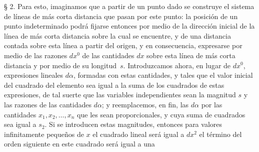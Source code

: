 \documentclass[a4paper, 12pt]{article}
\begin{document}
§ 2. Para esto, imaginamos que a partir de un punto dado se construye el sistema de líneas de más corta distancia que pasan por este punto: la posición de un punto indeterminado podrá fijarse entonces por medio de la dirección inicial de la línea de más corta distancia sobre la cual se encuentre, y de una distancia contada sobre esta línea a partir del origen, y en consecuencia,
expresarse por medio de las razones $dx^0$ de las cantidades $d x$ sobre esta línea de más corta distancia y por medio de su longitud~$s$. Introduzcamos ahora, en lugar de $d x^0$, expresiones lineales $d\alpha$, formadas con estas cantidades, y tales que el valor inicial del cuadrado del elemento sea igual a la suma de los cuadrados de estas expresiones, de tal suerte que las variables independientes sean la magnitud $s$ y las razones de las cantidades $d\alpha$; y reemplacemos, en fin, las $d\alpha$ por las cantidades $x_1,x_2, \dots, x_n$ que les sean proporcionales, y cuya suma de cuadrados sea igual a $s_2$. Si se introducen estas magnitudes, entonces para valores infinitamente pequeños de $x$ el cuadrado lineal será igual a $dx^2$ el término del orden siguiente en este cuadrado será igual a una
\end{document}
